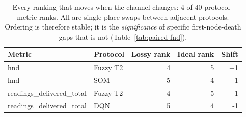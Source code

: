 \begin{table}[!t]
\caption{Every ranking that moves when the channel changes: 4 of 40 protocol--metric ranks. All are single-place swaps between adjacent protocols. Ordering is therefore stable; it is the \emph{significance} of specific first-node-death gaps that is not (Table~\ref{tab:paired-fnd}).}
\label{tab:robustness}
\centering
\begin{tabular}{llrrr}
\toprule
Metric & Protocol & Lossy rank & Ideal rank & Shift \\
\midrule
hnd & Fuzzy T2 & 4 & 5 & +1 \\
hnd & SOM & 5 & 4 & -1 \\
readings\_delivered\_total & Fuzzy T2 & 4 & 5 & +1 \\
readings\_delivered\_total & DQN & 5 & 4 & -1 \\
\bottomrule
\end{tabular}
\end{table}
